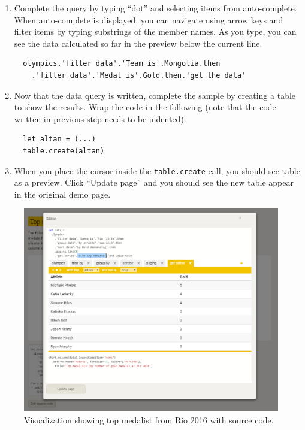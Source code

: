 \documentclass[a4paper,UKenglish]{darts}
\begin{document}
\begin{scope}
\begin{enumerate}
\item Complete the query by typing ``dot'' and selecting items from auto-complete. When auto-complete
  is displayed, you can navigate using arrow keys and filter items by typing substrings of the
  member names. As you type, you can see the data calculated so far in the preview below the
  current line.

\begin{verbatim}
  olympics.'filter data'.'Team is'.Mongolia.then
    .'filter data'.'Medal is'.Gold.then.'get the data'
\end{verbatim}
  
\item Now that the data query is written, complete the sample by creating a table to show the results.
  Wrap the code in the following (note that the code written in previous step needs to be indented):

\begin{verbatim}
  let altan = (...)
  table.create(altan)   
\end{verbatim}

\item When you place the cursor inside the \texttt{table.create} call, you should see table as a
  preview. Click ``Update page'' and you should see the new table appear in the original demo page.
\end{enumerate}

\begin{figure}
\begin{center}
\includegraphics[scale=0.35,trim=0mm 0mm 0mm 0mm,clip]{images/af-editor.png}
\end{center}
\caption{Visualization showing top medalist from Rio 2016 with source code.}
\label{fig:code}
\end{figure}


\end{scope}
\end{document}
